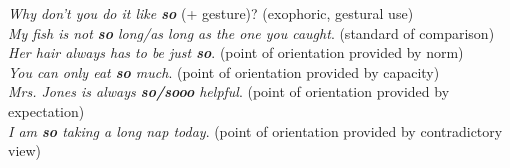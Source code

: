 \documentclass[output=paper,colorlinks,citecolor=brown]{langscibook}
\begin{document}
\ex\label{ex:koenig:14b} \textit{Why don’t you do it like \textbf{so}} (+ gesture)? \newline (exophoric, gestural use)\\

\ex\label{ex:koenig:14c} \textit{My fish is not \textbf{so} long/as long as the one you caught}. \newline (standard of comparison)\\

\ex\label{ex:koenig:14d} \textit{Her hair always has to be just \textbf{so}}. \newline (point of orientation provided by norm)\\

\ex\label{ex:koenig:14e} \textit{You can only eat \textbf{so} much}. \newline (point of orientation provided by capacity)\\

\ex\label{ex:koenig:14f} \textit{Mrs. Jones is always \textbf{so/sooo} helpful}. \newline (point of orientation provided by expectation)\\

\ex\label{ex:koenig:14g} \textit{I am \textbf{so} taking a long nap today}. \newline (point of orientation provided by contradictory view)\\
\z
\z
\end{document}
